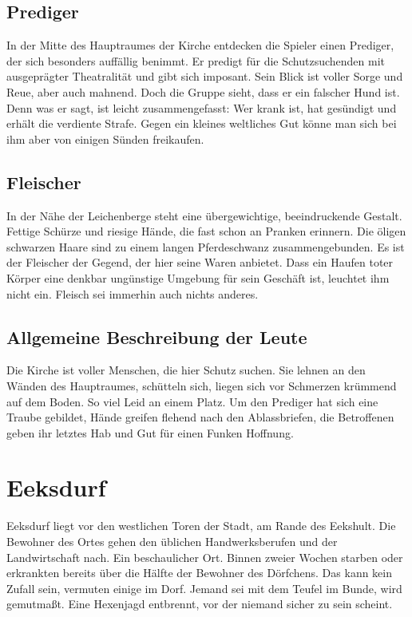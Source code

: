 \subsection{Prediger}

In der Mitte des Hauptraumes der Kirche entdecken die Spieler einen Prediger, der sich besonders auffällig benimmt. Er predigt für die Schutzsuchenden mit ausgeprägter Theatralität und gibt sich imposant. Sein Blick ist voller Sorge und Reue, aber auch mahnend. Doch die Gruppe sieht, dass er ein falscher Hund ist. Denn was er sagt, ist leicht zusammengefasst: Wer krank ist, hat gesündigt und erhält die verdiente Strafe. Gegen ein kleines weltliches Gut könne man sich bei ihm aber von einigen Sünden freikaufen.

\subsection{Fleischer}

In der Nähe der Leichenberge steht eine übergewichtige, beeindruckende Gestalt. Fettige Schürze und riesige Hände, die fast schon an Pranken erinnern. Die öligen schwarzen Haare sind zu einem langen Pferdeschwanz zusammengebunden. Es ist der Fleischer der Gegend, der hier seine Waren anbietet. Dass ein Haufen toter Körper eine denkbar ungünstige Umgebung für sein Geschäft ist, leuchtet ihm nicht ein. Fleisch sei immerhin auch nichts anderes.

\subsection{Allgemeine Beschreibung der Leute}

Die Kirche ist voller Menschen, die hier Schutz suchen. Sie lehnen an den Wänden des Hauptraumes, schütteln sich, liegen sich vor Schmerzen krümmend auf dem Boden. So viel Leid an einem Platz. Um den Prediger hat sich eine Traube gebildet, Hände greifen flehend nach den Ablassbriefen, die Betroffenen geben ihr letztes Hab und Gut für einen Funken Hoffnung.


\section{Eeksdurf}

Eeksdurf liegt vor den westlichen Toren der Stadt, am Rande des Eekshult. Die Bewohner des Ortes gehen den üblichen Handwerksberufen und der Landwirtschaft nach. Ein beschaulicher Ort. Binnen zweier Wochen starben oder erkrankten bereits über die Hälfte der Bewohner des Dörfchens. Das kann kein Zufall sein, vermuten einige im Dorf. Jemand sei mit dem Teufel im Bunde, wird gemutmaßt. Eine Hexenjagd entbrennt, vor der niemand sicher zu sein scheint.

